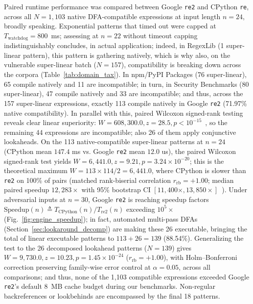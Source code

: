 \documentclass{ieeeaccess}
\begin{document}
Paired runtime performance was compared between Google \texttt{re2} and CPython \texttt{re}, across all $N = 1{,}103$ native DFA-compatible expressions at input length $n = 24$, broadly speaking. Exponential patterns that timed out were capped at $T_{\mathrm{watchdog}} = 800$~ms; assessing at $n = 22$ without timeout capping indistinguishably concludes, in actual application; indeed, in RegexLib (1 super-linear pattern), this pattern is gathering natively, which is why also, on the vulnerable super-linear batch ($N = 157$), compatibility is breaking down across the corpora (Table~\ref{tab:domain_tax}). In npm/PyPI Packages (76 super-linear), 65 compile natively and 11 are incompatible; in turn, in Security Benchmarks (80 super-linear), 47 compile natively and 33 are incompatible; and thus, across the 157 super-linear expressions, exactly 113 compile natively in Google \texttt{re2} (71.97\% native compatibility). In parallel with this, paired Wilcoxon signed-rank testing reveals clear linear superiority: $W = 608{,}300.0, z = 28.5, p < 10^{-15}$~\cite{wilcoxon1945individual}, so the remaining 44 expressions are incompatible; also 26 of them apply conjunctive lookaheads. On the 113 native-compatible super-linear patterns at $n = 24$ (CPython mean $147.4$ ms vs. Google \texttt{re2} mean $12.0$ us), the paired Wilcoxon signed-rank test yields $W = 6{,}441.0, z = 9.21, p = 3.24 \times 10^{-20}$; this is the theoretical maximum $W = 113 \times 114 / 2 = 6{,}441.0$, where CPython is slower than \texttt{re2} on 100\% of pairs (matched rank-biserial correlation $r_{\mathrm{rb}} = +1.00$; median paired speedup $12{,}283\times$ with 95\% bootstrap CI $[11{,}400\times, 13{,}850\times]$~\cite{efron1993introduction}). Under adversarial inputs at $n = 30$, Google \texttt{re2} is reaching speedup factors $\mathrm{Speedup}(n) \triangleq T_{\mathrm{CPython}}(n) / T_{\mathrm{re2}}(n)$ exceeding $10^5\times$ (Fig.~\ref{fig:engine_speedup}); in fact, automated multi-pass DFAs (Section~\ref{sec:lookaround_decomp}) are making these 26 executable, bringing the total of linear executable patterns to $113 + 26 = 139$ (88.54\%). Generalizing the test to the 26 decomposed lookahead patterns ($N = 139$) gives $W = 9{,}730.0, z = 10.23, p = 1.45 \times 10^{-24}$ ($r_{\mathrm{rb}} = +1.00$), with Holm--Bonferroni correction preserving family-wise error control at $\alpha = 0.05$, across all comparisons; and thus, none of the 1,103 compatible expressions exceeded Google \texttt{re2}'s default 8~MB cache budget during our benchmarks. Non-regular backreferences or lookbehinds are encompassed by the final 18 patterns.
\end{document}
